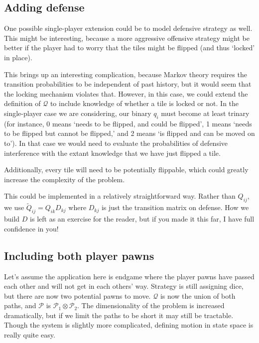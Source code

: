 \documentclass[letterpaper]{article}
\begin{document}
\subsection{Adding defense}
One possible single-player extension could be to model defensive strategy as
well.  This might be interesting, because a more aggressive offensive strategy
might be better if the player had to worry that the tiles might be flipped (and
thus `locked' in place).

This brings up an interesting complication, because Markov theory requires the
transition probabilities to be independent of past history, but it would seem
that the locking mechanism violates that.  However, in this case, we could
extend the definition of $\mathcal{Q}$ to include knowledge of whether a tile
is locked or not.  In the single-player case we are considering, our binary 
$q_i$ must become at least trinary (for instance, 0 means `needs to be flipped,
and could be flipped', 1 means `needs to be flipped but cannot be flipped,'
and 2 means `is flipped and can be moved on to').  In that case we would need
to evaluate the probabilities of defensive interference with the extant
knowledge that we have just flipped a tile.

Additionally, every tile will need to be potentially flippable, which could
greatly increase the complexity of the problem.

This could be implemented in a relatively straightforward way.  Rather than
$Q_{ij}$, we use $\tilde{Q}_{ij} = Q_{ik}D_{kj}$ where $D_{kj}$ is just the
transition matrix on defense.  How we build $D$ is left as an exercise for the
reader, but if you made it this far, I have full confidence in you!

\subsection{Including both player pawns}
Let's assume the application here is endgame where the player pawns have
passed each other and will not get in each others' way.  Strategy is still
assigning dice, but there are now two potential pawns to move.  $\mathcal{Q}$ 
is now the union of both paths, and $\mathcal{P}$ is $\mathcal{P}_1\otimes
\mathcal{P}_2$.  The dimensionality of the problem is increased dramatically,
but if we limit the paths to be short it may still be tractable.  Though the
system is slightly more complicated, defining motion in state space is really
quite easy.
\end{document}
